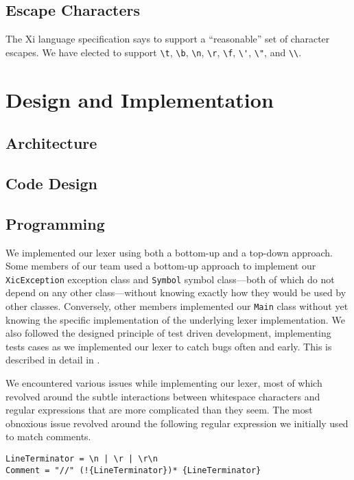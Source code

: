 \documentclass{hw}
\begin{document}
\subsection{Escape Characters}
The Xi language specification says to support a ``reasonable'' set of character
escapes. We have elected to support \verb$\t$, \verb$\b$, \verb$\n$, \verb$\r$,
\verb$\f$, \verb$\'$, \verb$\"$, and \verb$\\$.


\section{Design and Implementation}\label{sec:design}
\subsection{Architecture}
\subsection{Code Design}

\subsection{Programming}
We implemented our lexer using both a bottom-up and a top-down approach. Some
members of our team used a bottom-up approach to implement our
\texttt{XicException} exception class and \texttt{Symbol} symbol class---both
of which do not depend on any other class---without knowing exactly how they
would be used by other classes. Conversely, other members implemented our
\texttt{Main} class without yet knowing the specific implementation of the
underlying lexer implementation. We also followed the designed principle of
test driven development, implementing tests cases as we implemented our lexer
to catch bugs often and early. This is described in detail in .

We encountered various issues while implementing our lexer, most of which
revolved around the subtle interactions between whitespace characters and
regular expressions that are more complicated than they seem. The most
obnoxious issue revolved around the following regular expression we initially
used to match comments.

\begin{center}
\begin{BVerbatim}
LineTerminator = \n | \r | \r\n
Comment = "//" (!{LineTerminator})* {LineTerminator}
\end{BVerbatim}
\end{center}
\end{document}
